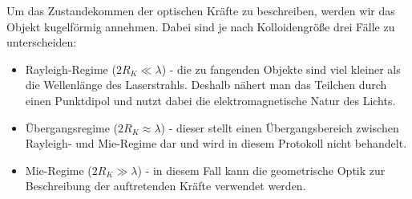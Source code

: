 \documentclass[a4paper,titlepage]{scrartcl}
\numberwithin{equation}{section}
\begin{document}
Um das Zustandekommen der optischen Kräfte zu beschreiben, werden wir das Objekt kugelförmig annehmen. Dabei sind je nach Kolloidengröße drei Fälle zu unterscheiden:
\begin{itemize}
\item Rayleigh-Regime ($2R_K \ll \lambda$) - die zu fangenden Objekte sind viel kleiner als die Wellenlänge des Laserstrahls. Deshalb nähert man das Teilchen durch einen Punktdipol und nutzt dabei die elektromagnetische Natur des Lichts.
\item Übergangsregime ($2R_K \approx \lambda$) - dieser stellt einen Übergangsbereich zwischen Rayleigh- und Mie-Regime dar und wird in diesem Protokoll nicht behandelt.
\item Mie-Regime ($2R_K \gg \lambda$) - in diesem Fall kann die geometrische Optik zur Beschreibung der auftretenden Kräfte verwendet werden.
\end{itemize}
\end{document}
